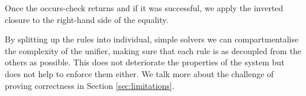 \begin{imageonly}
\begin{Shaded}
\begin{Highlighting}[]
\NormalTok{ (} \OperatorTok{:\textless{}:}
               \OtherTok{=\textgreater{}} 
\OtherTok{=} 
  \NormalTok{ (}\NormalTok{ (}\OtherTok{=}
\NormalTok{      (}\NormalTok{ (}\OtherTok{=}
\OtherTok{\textless{}{-}}
    \OtherTok{{-}\textgreater{}}  
    \OtherTok{{-}\textgreater{}}
        \OtherTok{{-}\textgreater{}} 
          \OtherTok{=}
           
         \OtherTok{{-}\textgreater{}}  
\end{Highlighting}
\end{Shaded}
\end{imageonly}

Once the occurs-check returns and if it was successful, we apply the
inverted closure to the right-hand side of the equality.

By splitting up the rules into individual, simple solvers we can
compartmentalise the complexity of the unifier, making sure that each
rule is as decoupled from the others as possible. This does not
deteriorate the properties of the system but does not help to enforce
them either. We talk more about the challenge of proving correctness in
Section \ref{sec:limitations}.

